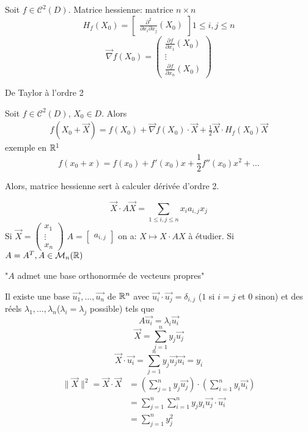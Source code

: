 \begin{definition}
    Soit $f \in \mathcal{C}^2(D)$. Matrice hessienne: matrice  $n \times n$
    \[
    H_f(X_0) = \begin{bmatrix} \frac{\partial^2}{\partial x_i \partial x_j}(X_0) \end{bmatrix} 1\le i,j \le n
    \] 
    \[
        \vec{\nabla}f(X_0) = \begin{pmatrix} \frac{\partial f}{\partial x_1}(X_0) \\ \vdots \\ \frac{\partial f}{\partial x_n}(X_0) \end{pmatrix} 
    \] 
\end{definition}

\begin{theorem} De Taylor à l'ordre 2 \par
    Soit $f \in \mathcal{C}^2(D)$,  $X_0 \in D$. Alors  
    \begin{align*}
        f(X_0 + \vec{X}) = f(X_0) + \vec{\nabla }f(X_0) \cdot \vec{X} + \frac{1}{2}\vec{X} \cdot H_f(X_0)\vec{X}
    \end{align*}
    exemple en $\mathbb{R}^1$
    \[
    f(x_0 + x) = f(x_0) + f'(x_0)x + \frac{1}{2}f''(x_0)x^2 + \ldots
    \] 
\end{theorem}
\begin{intuition}
   Alors, matrice hessienne sert à calculer dérivée d'ordre 2. 
\end{intuition}

\[
    \vec{X} \cdot A\vec{X} = \sum_{1\le i,j \le n}^{} x_ia_{i,j}x_j
\] 
Si $\vec{X} = \begin{pmatrix} x_1 \\ \vdots \\ x_n \end{pmatrix}$ $A = \begin{bmatrix} a_{i,j} \end{bmatrix}$ on a: $X \mapsto X \cdot AX$ à étudier. Si $A = A^T, A \in \mathcal{M}_n(\mathbb{R})$
\begin{center}
   "$A$ admet une base orthonormée de vecteurs propres" 
\end{center}
Il existe une base $\vec{u_1}, \ldots, \vec{u_n}$ de $\mathbb{R}^n$ avec $\vec{u_i} \cdot \vec{u_j} = \delta_{i, j}$ ($1$ si  $i = j$ et  $0$ sinon) et des réels $\lambda_1, \ldots, \lambda_n$($\lambda_i = \lambda_j$ possible) tels que
\[
    A\vec{u_i} = \lambda_i\vec{u_i}
\] 
\[
    \vec{X} = \sum_{j=1}^{n} y_j\vec{u_j}
\] 
\[
    \vec{X} \cdot \vec{u_i} = \sum_{j=1}^{n} y_j\vec{u_j}\vec{u_i} = y_i
\] 
\begin{align*}
    \|\vec{X}\|^2 = \vec{X} \cdot \vec{X} &= \left( \sum_{j=1}^{n} y_j\vec{u_j} \right) \cdot \left( \sum_{i=1}^{n} y_i\vec{u_i} \right) \\
                                          &= \sum_{j=1}^{n} \sum_{i=1}^{n} y_jy_i\vec{u_j}\cdot \vec{u_i}\\ 
                                          &= \sum_{j=1}^{n} y_j^2
\end{align*}

